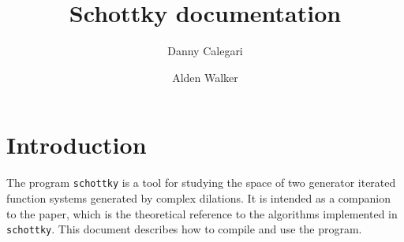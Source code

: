 \documentclass{amsart}
\begin{document}
\newtheorem{theorem}{Theorem}[subsection]
\newtheorem{lemma}[theorem]{Lemma}
\newtheorem{corollary}[theorem]{Corollary}
\newtheorem{conjecture}[theorem]{Conjecture}
\newtheorem{proposition}[theorem]{Proposition}
\newtheorem{question}[theorem]{Question}
\newtheorem{problem}[theorem]{Problem}
\newtheorem*{main_thm}{Random Surface Subgroup Theorem~\ref{thm:random_amalgam_surface}}
\newtheorem*{claim}{Claim}
\newtheorem*{criterion}{Criterion}
\theoremstyle{definition}
\newtheorem{definition}[theorem]{Definition}
\newtheorem{construction}[theorem]{Construction}
\newtheorem{notation}[theorem]{Notation}
\newtheorem{convention}[theorem]{Convention}
\newtheorem*{warning}{Warning}

\theoremstyle{remark}
\newtheorem{remark}[theorem]{Remark}
\newtheorem{example}[theorem]{Example}
\newtheorem*{case}{Case}

\def\Z{{\mathbb Z}}
\def\R{{\mathbb R}}
\def\H{{\mathbb H}}
\def\E{{\mathcal E}}
\def\rot{\textnormal{rot}}
\def\scl{\textnormal{scl}}

\def\tra{\textnormal{tr}}
\def\length{\textnormal{length}}

\newcommand{\marginal}[1]{\marginpar{\tiny #1}}



\title{Schottky documentation}
\author{Danny Calegari}
\address{Department of Mathematics \\ University of Chicago \\
Chicago, Illinois, 60637}
\author{Alden Walker}
\address{Department of Mathematics \\ University of Chicago \\
Chicago, Illinois, 60637}


\maketitle

\section{Introduction}

The program \texttt{schottky}\cite{program} is a tool for studying the 
space of two generator iterated function systems generated by complex dilations. 
It is intended as a companion to the paper\cite{paper}, which 
is the theoretical reference to the algorithms implemented in \texttt{schottky}.
This document describes how to compile and use the program.
\end{document}
